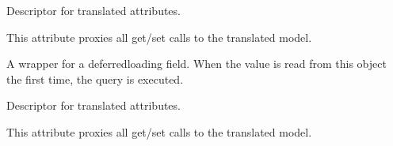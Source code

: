 \documentclass[letterpaper,10pt,french]{sphinxmanual}
\begin{document}
\begin{fulllineitems}
\begin{fulllineitems}
\label{\detokenize{index:core.models.FoodInfo.burger_food_hours_start}}
\pysigstartsignatures
\pysigline
{}
\pysigstopsignatures
\sphinxAtStartPar
Descriptor for translated attributes.

\sphinxAtStartPar
This attribute proxies all get/set calls to the translated model.

\end{fulllineitems}


\begin{fulllineitems}
\label{\detokenize{index:core.models.FoodInfo.id}}
\pysigstartsignatures
\pysigline
{}
\pysigstopsignatures
\sphinxAtStartPar
A wrapper for a deferred\sphinxhyphen{}loading field. When the value is read from this
object the first time, the query is executed.

\end{fulllineitems}


\begin{fulllineitems}
\label{\detokenize{index:core.models.FoodInfo.pizza_food_days}}
\pysigstartsignatures
\pysigline
{}
\pysigstopsignatures
\sphinxAtStartPar
Descriptor for translated attributes.

\sphinxAtStartPar
This attribute proxies all get/set calls to the translated model.

\end{fulllineitems}


\end{fulllineitems}

\end{document}
